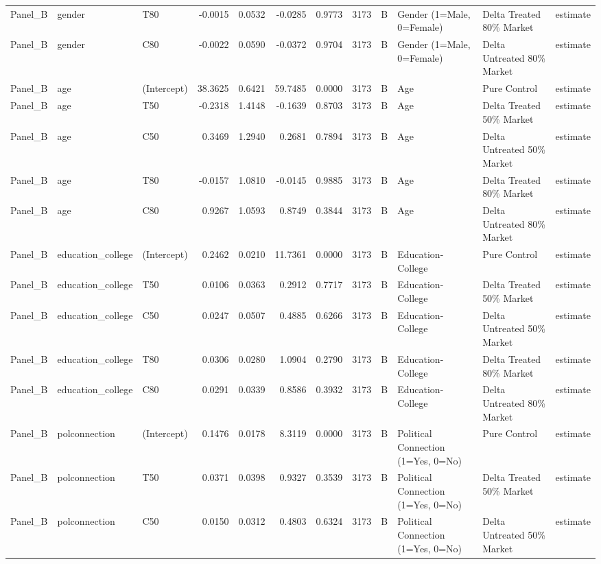 \begin{table}
\begin{tabular}[t]{lllrrrrrllll}
Panel\_B & gender & T80 & -0.0015 & 0.0532 & -0.0285 & 0.9773 & 3173 & B & Gender (1=Male, 0=Female) & Delta Treated 80\% Market & estimate\\
Panel\_B & gender & C80 & -0.0022 & 0.0590 & -0.0372 & 0.9704 & 3173 & B & Gender (1=Male, 0=Female) & Delta Untreated 80\% Market & estimate\\
\addlinespace
Panel\_B & age & (Intercept) & 38.3625 & 0.6421 & 59.7485 & 0.0000 & 3173 & B & Age & Pure Control & estimate\\
Panel\_B & age & T50 & -0.2318 & 1.4148 & -0.1639 & 0.8703 & 3173 & B & Age & Delta Treated 50\% Market & estimate\\
Panel\_B & age & C50 & 0.3469 & 1.2940 & 0.2681 & 0.7894 & 3173 & B & Age & Delta Untreated 50\% Market & estimate\\
Panel\_B & age & T80 & -0.0157 & 1.0810 & -0.0145 & 0.9885 & 3173 & B & Age & Delta Treated 80\% Market & estimate\\
Panel\_B & age & C80 & 0.9267 & 1.0593 & 0.8749 & 0.3844 & 3173 & B & Age & Delta Untreated 80\% Market & estimate\\
\addlinespace
Panel\_B & education\_college & (Intercept) & 0.2462 & 0.0210 & 11.7361 & 0.0000 & 3173 & B & Education-College & Pure Control & estimate\\
Panel\_B & education\_college & T50 & 0.0106 & 0.0363 & 0.2912 & 0.7717 & 3173 & B & Education-College & Delta Treated 50\% Market & estimate\\
Panel\_B & education\_college & C50 & 0.0247 & 0.0507 & 0.4885 & 0.6266 & 3173 & B & Education-College & Delta Untreated 50\% Market & estimate\\
Panel\_B & education\_college & T80 & 0.0306 & 0.0280 & 1.0904 & 0.2790 & 3173 & B & Education-College & Delta Treated 80\% Market & estimate\\
Panel\_B & education\_college & C80 & 0.0291 & 0.0339 & 0.8586 & 0.3932 & 3173 & B & Education-College & Delta Untreated 80\% Market & estimate\\
\addlinespace
Panel\_B & polconnection & (Intercept) & 0.1476 & 0.0178 & 8.3119 & 0.0000 & 3173 & B & Political Connection (1=Yes, 0=No) & Pure Control & estimate\\
Panel\_B & polconnection & T50 & 0.0371 & 0.0398 & 0.9327 & 0.3539 & 3173 & B & Political Connection (1=Yes, 0=No) & Delta Treated 50\% Market & estimate\\
Panel\_B & polconnection & C50 & 0.0150 & 0.0312 & 0.4803 & 0.6324 & 3173 & B & Political Connection (1=Yes, 0=No) & Delta Untreated 50\% Market & estimate\\

\end{tabular}
\end{table}

